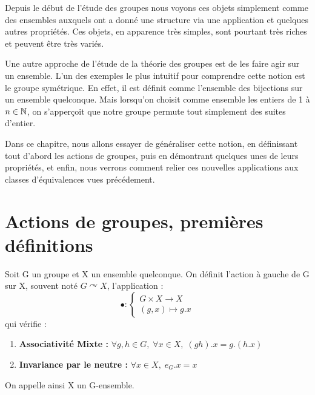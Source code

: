 
\minitoc  %

Depuis le début de l'étude des groupes nous voyons ces objets simplement comme des ensembles auxquels ont 
a donné une structure via une application et quelques autres propriétés. Ces objets, en apparence très simples, 
sont pourtant très riches et peuvent être très variés. 

Une autre approche de l'étude de la théorie des groupes est de les faire agir sur un ensemble. L'un des exemples 
le plus intuitif pour comprendre cette notion est le groupe symétrique. En effet, il est définit comme l'ensemble des 
bijections sur un ensemble quelconque. Mais lorsqu'on choisit comme ensemble les entiers de 1 à $n \in \mathbb{N}$, on s'apperçoit
que notre groupe permute tout simplement des suites d'entier. 

Dans ce chapitre, nous allons essayer de généraliser cette notion, en définissant tout d'abord les actions de groupes, 
puis en démontrant quelques unes de leurs propriétés, et enfin, nous verrons comment relier ces nouvelles applications
aux classes d'équivalences vues précédement. 


\section{Actions de groupes, premières définitions}

\begin{definition}
	Soit G un groupe et X un ensemble quelconque. On définit l'action à gauche de G sur X, souvent noté $ G \curvearrowright X$,
	l'application : 
		\[ \bullet : 
			\begin{cases}
				G \times X \longrightarrow X \\
				(g,x) \longmapsto g.x 
			\end{cases} \] 
	qui vérifie :
	\begin{enumerate}
		\item[i)] \textbf{Associativité Mixte :} $ \forall g,h \in G, \; \forall x \in X, \; (gh).x = g.(h.x)$ 
		\item[ii)] \textbf{Invariance par le neutre :} $ \forall x \in X, \; e_G . x = x $ 
	\end{enumerate}
	On appelle ainsi X un G-ensemble. 
\end{definition}

